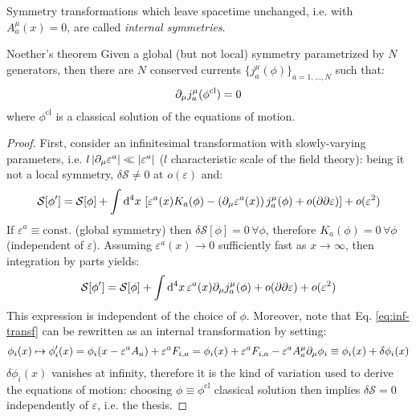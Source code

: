 Symmetry transformations which leave spacetime unchanged, i.e. with $ A^\mu_a(x) = 0 $, are called \textit{internal symmetries}.

\begin{theorem}{Noether's theorem}{}
  Given a global (but not local) symmetry parametrized by $ N $ generators, then there are $ N $ conserved currents $ \{j^\mu_a(\phi)\}_{a = 1, \dots, N} $ such that:
  \begin{equation}
    \partial_\mu j^\mu_a(\phi^\mathrm{cl}) = 0
  \end{equation}
  where $ \phi^\mathrm{cl} $ is a classical solution of the equations of motion.

  \tcblower

  \begin{proof}
    First, consider an infinitesimal transformation with slowly-varying parameters, i.e. $ l \left\lvert\partial_\mu \varepsilon^a\right\rvert \ll \left\lvert\varepsilon^a\right\rvert $ ($ l $ characteristic scale of the field theory): being it not a local symmetry, $ \delta \mathcal{S} \neq 0 $ at $ o(\varepsilon) $ and:
    \begin{equation*}
      \mathcal{S}[\phi'] = \mathcal{S}[\phi] + \int \mathrm{d}^4 x\, \left[ \varepsilon^a(x) K_a(\phi) - \left( \partial_\mu \varepsilon^a(x) \right) j^\mu_a(\phi) + o(\partial \partial \varepsilon) \right] + o(\varepsilon^2)
    \end{equation*}
    If $ \varepsilon^a \equiv \mathrm{const.} $ (global symmetry) then $ \delta \mathcal{S}[\phi] = 0 \,\forall \phi $, therefore $ K_a(\phi) = 0 \,\forall \phi $ (independent of $ \varepsilon $). Assuming $ \varepsilon^a(x) \rightarrow 0 $ sufficiently fast as $ x \rightarrow \infty $, then integration by parts yields:
    \begin{equation*}
      \mathcal{S}[\phi'] = \mathcal{S}[\phi] + \int \mathrm{d}^4 x\, \varepsilon^a(x) \partial_\mu j^\mu_a(\phi) + o(\partial \partial \varepsilon) + o(\varepsilon^2)
    \end{equation*}
    This expression is independent of the choice of $ \phi $. Moreover, note that Eq. \ref{eq:inf-transf} can be rewritten as an internal transformation by setting:
    \begin{equation*}
      \phi_i(x) \mapsto \phi'_i(x) = \phi_i(x - \varepsilon^a A_a) + \varepsilon^a F_{i,a} = \phi_i(x) + \varepsilon^a F_{i,a} - \varepsilon^a A^\mu_a \partial_\mu \phi_i \equiv \phi_i(x) + \delta \phi_i(x)
    \end{equation*}
    $ \delta \phi_i(x) $ vanishes at infinity, therefore it is the kind of variation used to derive the equations of motion: choosing $ \phi \equiv \phi^\mathrm{cl} $ classical solution then implies $ \delta \mathcal{S} = 0 $ independently of $ \varepsilon $, i.e. the thesis.
  \end{proof}
\end{theorem}

